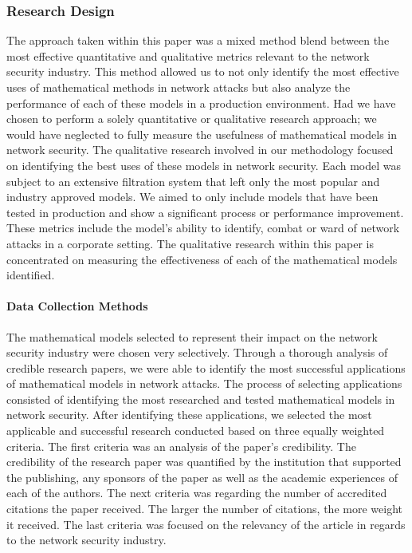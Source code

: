 \documentclass{article}
\begin{document}
\subsubsection{Research Design}
The approach taken within this paper was a mixed method blend between the most effective quantitative and qualitative metrics relevant to the network security industry. This method allowed us to not only identify the most effective uses of mathematical methods in network attacks but also analyze the performance of each of these models in a production environment. Had we have chosen to perform a solely quantitative or qualitative research approach; we would have neglected to fully measure the usefulness of mathematical models in network security. The qualitative research involved in our methodology focused on identifying the best uses of these models in network security. Each model was subject to an extensive filtration system that left only the most popular and industry approved models. We aimed to only include models that have been tested in production and show a significant process or performance improvement. These metrics include the model’s ability to identify, combat or ward of network attacks in a corporate setting. The qualitative research within this paper is concentrated on measuring the effectiveness of each of the mathematical models identified. 

\paragraph{Data Collection Methods}
The mathematical models selected to represent their impact on the network security industry were chosen very selectively. Through a thorough analysis of credible research papers, we were able to identify the most successful applications of mathematical models in network attacks. The process of selecting applications consisted of identifying the most researched and tested mathematical models in network security. After identifying these applications, we selected the most applicable and successful research conducted based on three equally weighted criteria. The first criteria was an analysis of the paper’s credibility. The credibility of the research paper was quantified by the institution that supported the publishing, any sponsors of the paper as well as the academic experiences of each of the authors. The next criteria was regarding the number of accredited citations the paper received. The larger the number of citations, the more weight it received. The last criteria was focused on the relevancy of the article in regards to the network security industry. 
\end{document}
